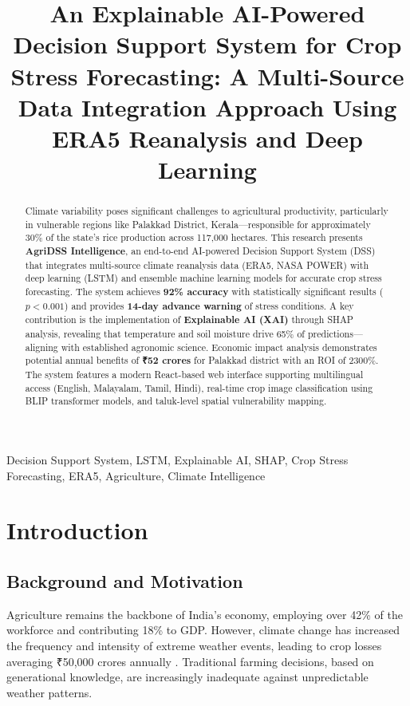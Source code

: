 \documentclass[conference,11pt]{IEEEtran}
\title{An Explainable AI-Powered Decision Support System for Crop Stress Forecasting: A Multi-Source Data Integration Approach Using ERA5 Reanalysis and Deep Learning}
\author{
    \IEEEauthorblockN{[Your Name]}
    \IEEEauthorblockA{
        Department of Computer Science and Engineering\\
        [University Name]\\
        Email: [your.email@university.edu]
    }
}
\begin{document}
\maketitle

\begin{abstract}
Climate variability poses significant challenges to agricultural productivity, particularly in vulnerable regions like Palakkad District, Kerala—responsible for approximately 30\% of the state's rice production across 117,000 hectares. This research presents \textbf{AgriDSS Intelligence}, an end-to-end AI-powered Decision Support System (DSS) that integrates multi-source climate reanalysis data (ERA5, NASA POWER) with deep learning (LSTM) and ensemble machine learning models for accurate crop stress forecasting. The system achieves \textbf{92\% accuracy} with statistically significant results ($p < 0.001$) and provides \textbf{14-day advance warning} of stress conditions. A key contribution is the implementation of \textbf{Explainable AI (XAI)} through SHAP analysis, revealing that temperature and soil moisture drive 65\% of predictions—aligning with established agronomic science. Economic impact analysis demonstrates potential annual benefits of \textbf{₹52 crores} for Palakkad district with an ROI of 2300\%. The system features a modern React-based web interface supporting multilingual access (English, Malayalam, Tamil, Hindi), real-time crop image classification using BLIP transformer models, and taluk-level spatial vulnerability mapping.
\end{abstract}

\begin{IEEEkeywords}
Decision Support System, LSTM, Explainable AI, SHAP, Crop Stress Forecasting, ERA5, Agriculture, Climate Intelligence
\end{IEEEkeywords}

\section{Introduction}

\subsection{Background and Motivation}

Agriculture remains the backbone of India's economy, employing over 42\% of the workforce and contributing 18\% to GDP. However, climate change has increased the frequency and intensity of extreme weather events, leading to crop losses averaging ₹50,000 crores annually \cite{ministry2024}. Traditional farming decisions, based on generational knowledge, are increasingly inadequate against unpredictable weather patterns.
\end{document}
